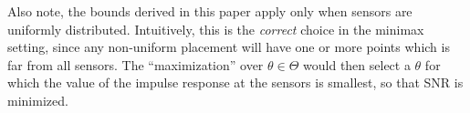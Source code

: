 \documentclass[conference]{IEEEtran}
\DeclarePairedDelimiter\abs{\lvert}{\rvert}
\begin{document}
Also note, the bounds derived in this paper apply only when sensors are
uniformly distributed.  Intuitively, this is the \emph{correct} choice in the
minimax setting, since any non-uniform placement will have one or more points
which is far from all sensors. The ``maximization'' over $\theta \in \Theta$
would then select a $\theta$ for which the value of the impulse response at the
sensors is smallest, so that SNR is minimized.





\end{document}
